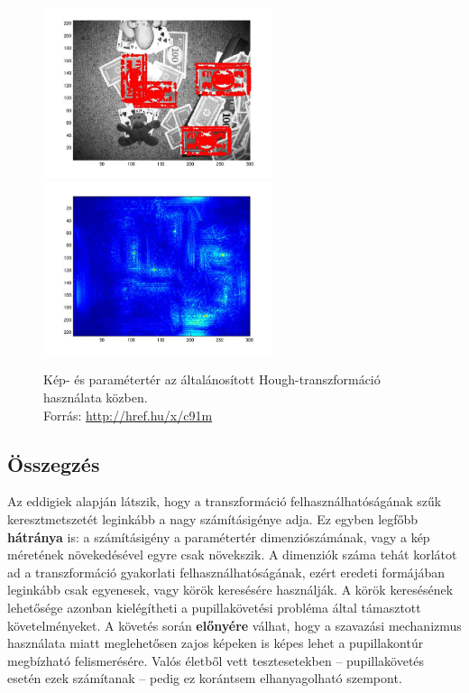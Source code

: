 \begin{figure}[!ht]
\centering
\includegraphics[width=67mm, keepaspectratio]{figures/generalhough_money_1.png}\hspace{1cm}
\includegraphics[width=67mm, keepaspectratio]{figures/generalhough_money_2.png}
\caption{Kép- és paramétertér az általánosított Hough-transzformáció használata közben.\\Forrás: \url{http://href.hu/x/c91m}}
\label{fig:generalhough}
\end{figure}

\subsection{Összegzés}\label{sect:hough_osszefoglalas}

Az eddigiek alapján látszik, hogy a transzformáció felhasználhatóságának szűk keresztmetszetét leginkább a nagy számításigénye adja. Ez egyben legfőbb \textbf{hátránya} is: a számításigény a paramétertér dimenziószámának, vagy a kép méretének növekedésével egyre csak növekszik. A dimenziók száma tehát korlátot ad a transzformáció gyakorlati felhasználhatóságának, ezért eredeti formájában leginkább csak egyenesek, vagy körök keresésére használják. A körök keresésének lehetősége azonban kielégítheti a pupillakövetési probléma által támasztott követelményeket. A követés során \textbf{előnyére} válhat, hogy a szavazási mechanizmus használata miatt meglehetősen zajos képeken is képes lehet a pupillakontúr megbízható felismerésére. Valós életből vett tesztesetekben -- pupillakövetés esetén ezek számítanak -- pedig ez korántsem elhanyagolható szempont.


